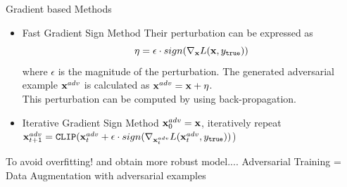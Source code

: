 \documentclass[handout,xcolor=pdftex,dvipsnames,table,mathserif]{beamer}
\begin{document}



\begin{frame}{Gradient based Methods}
\begin{itemize}
\item Fast Gradient Sign Method \cite{Adversarial}
Their perturbation can be expressed as
\begin{equation}
\eta =\epsilon \cdot sign(\nabla_{\mathbf{x}} L (\mathbf{x},y_{\texttt{true}}))
\end{equation}
where $\epsilon$ is the magnitude of the perturbation.
The generated adversarial example $\mathbf{x}^{adv}$ is calculated as $\mathbf{x}^{adv}=\mathbf{x}+\eta$.\\
This perturbation can be computed by using back-propagation.
\item Iterative Gradient Sign Method \cite{kurakin2016adversarial}
$\mathbf{x}_{0}^{adv}=\mathbf{x}$, iteratively repeat $\mathbf{x}_{t+1}^{adv}=\texttt{CLIP} (\mathbf{x}_{t}^{adv} + \epsilon \cdot sign(\nabla_{\mathbf{x}_{t}^{adv}} L (\mathbf{x}_{t}^{adv},y_{\texttt{true}}))$)
\end{itemize}
\pause
\alert{To avoid overfitting! and obtain more robust model.... Adversarial Training = Data Augmentation with adversarial examples}
\end{frame}

\end{document}
